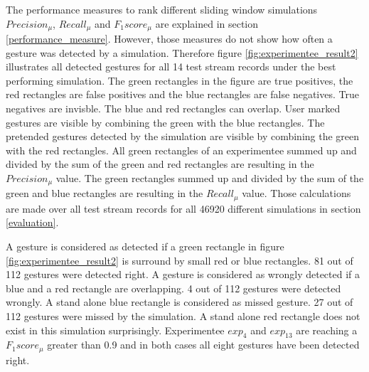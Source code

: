 The performance measures to rank different sliding window simulations $Precision_{\mu}$, $Recall_{\mu}$ and
$F_{1}score_{\mu}$ are explained in section \ref{performance_measure}. However, those measures do not show how often a
gesture was detected by a simulation. Therefore figure \ref{fig:experimentee_result2} illustrates all detected
gestures for all 14 test stream records under the best performing simulation. The green rectangles in the figure are true positives,
the red rectangles are false positives and the blue rectangles are false negatives. True negatives are invisble. The
blue and red rectangles can overlap. User marked gestures are visible by combining the green with the blue rectangles.
The pretended gestures detected by the simulation are visible by combining the green with the red rectangles. All green
rectangles of an experimentee summed up and divided by the sum of the green and red rectangles are resulting in the
$Precision_{\mu}$ value. The green rectangles summed up and divided by the sum of the green and blue rectangles are
resulting in the $Recall_{\mu}$ value. Those calculations are made over all test stream records for all 46920 different
simulations in section \ref{evaluation}.

A gesture is considered as detected if a green rectangle in figure \ref{fig:experimentee_result2} is surround by small
red or blue rectangles. 81 out of 112 gestures were detected right. A gesture is considered as wrongly
detected if a blue and a red rectangle are overlapping. 4 out of 112 gestures were detected wrongly. A
stand alone blue rectangle is considered as missed gesture. 27 out of 112 gestures were missed by the
simulation. A stand alone red rectangle does not exist in this simulation surprisingly. Experimentee $exp_4$ and
$exp_{13}$ are reaching a $F_{1}score_{\mu}$ greater than 0.9 and in both cases all eight gestures have been detected
right.

